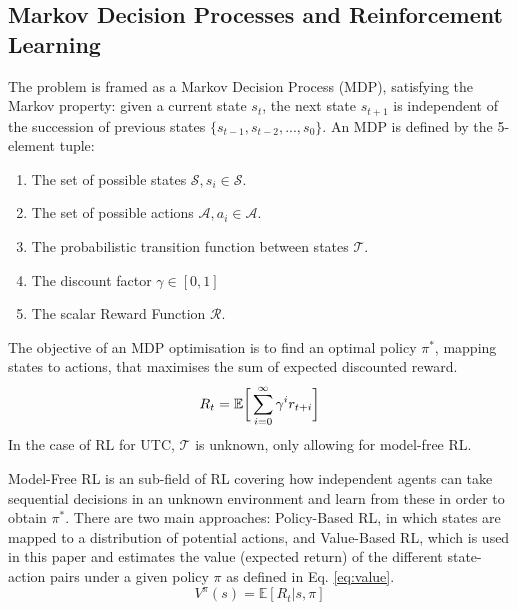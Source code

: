 \documentclass[conference]{IEEEtran}
\begin{document}
\subsection{Markov Decision Processes and Reinforcement Learning}
The problem is framed as a Markov Decision Process (MDP), satisfying the Markov property: given a current state $s_t$, the next state $s_{t+1}$ is independent of the succession of previous states $\{s_{t-1}, s_{t-2}, ..., s_0\}$.
An MDP is defined by the 5-element tuple:
\begin{enumerate}
\item The set of possible states $\mathcal{S}, s_i\in \mathcal{S}$.
\item The set of possible actions $\mathcal{A}, a_i\in \mathcal{A}$.
\item The probabilistic transition function between states $\mathcal{T}$.
\item The discount factor $\gamma \in [0,1]$ 
\item The scalar Reward Function $\mathcal{R}$. 
\end{enumerate}

The objective of an MDP optimisation is to find an optimal policy $\pi^*$, mapping states to actions, that maximises the sum of expected discounted reward.
\begin{equation}
R_t = \mathbb{E} \bigg{[} \sum^{\infty}_{i=0} \gamma^i r_{t+i} \bigg{]} 
\label{eq:reward}
\end{equation}
In the case of RL for UTC, $\mathcal{T}$ is unknown, only allowing for model-free RL.

Model-Free RL is an sub-field of RL covering how independent agents can take sequential decisions in an unknown environment and learn from these in order to obtain $\pi^*$. 
There are two main approaches: Policy-Based RL, in which states are mapped to a distribution of potential actions, and Value-Based RL, which is used in this paper and estimates the value (expected return) of the different state-action pairs under a given policy $\pi$ as defined in Eq. \ref{eq:value}.
\begin{equation}
V^{\pi}(s) = \mathbb{E} [R_t|s,\pi]
\label{eq:value}
\end{equation}
\end{document}
